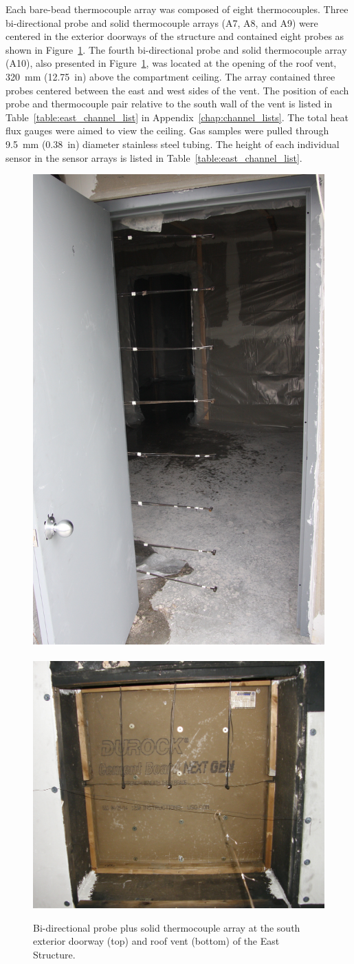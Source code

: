 Each bare-bead thermocouple array was composed of eight thermocouples. Three bi-directional probe and solid thermocouple arrays (A7, A8, and A9) were centered in the exterior doorways of the structure and contained eight probes as shown in Figure~\ref{fig:BDP_arrays}. The fourth bi-directional probe and solid thermocouple array (A10), also presented in Figure~\ref{fig:BDP_arrays}, was located at the opening of the roof vent, 320~mm (12.75~in) above the compartment ceiling. The array contained three probes centered between the east and west sides of the vent. The position of each probe and thermocouple pair relative to the south wall of the vent is listed in Table~\ref{table:east_channel_list} in Appendix~\ref{chap:channel_lists}. The total heat flux gauges were aimed to view the ceiling. Gas samples were pulled through 9.5~mm (0.38~in) diameter stainless steel tubing. The height of each individual sensor in the sensor arrays is listed in Table~\ref{table:east_channel_list}.

\begin{figure}
	\centering
	\includegraphics[width=0.45\columnwidth]{Figures/Pictures/doorway_BDPs}
	\\~\\
	\includegraphics[width=0.65\columnwidth]{Figures/Pictures/roof_vent_BDPs}
	\caption[Bi-directional probe plus solid thermocouple arrays in East Structure]{Bi-directional probe plus solid thermocouple array at the south exterior doorway (top) and roof vent (bottom) of the East Structure.}
	\label{fig:BDP_arrays}
\end{figure}

